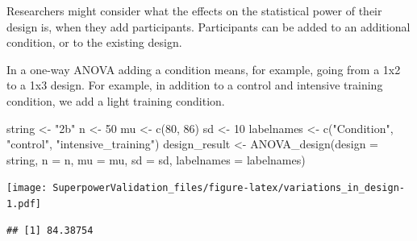 \documentclass[
]{book}
\newenvironment{Shaded}{\begin{snugshade}}{\end{snugshade}}
\newcommand{\AttributeTok}[1]{\textcolor[rgb]{0.77,0.63,0.00}{#1}}
\newcommand{\CommentTok}[1]{\textcolor[rgb]{0.56,0.35,0.01}{\textit{#1}}}
\newcommand{\DecValTok}[1]{\textcolor[rgb]{0.00,0.00,0.81}{#1}}
\newcommand{\FunctionTok}[1]{\textcolor[rgb]{0.00,0.00,0.00}{#1}}
\newcommand{\NormalTok}[1]{#1}
\newcommand{\OtherTok}[1]{\textcolor[rgb]{0.56,0.35,0.01}{#1}}
\newcommand{\SpecialCharTok}[1]{\textcolor[rgb]{0.00,0.00,0.00}{#1}}
\newcommand{\StringTok}[1]{\textcolor[rgb]{0.31,0.60,0.02}{#1}}
\begin{document}
Researchers might consider what the effects on the statistical power of their design is, when they add participants. Participants can be added to an additional condition, or to the existing design.

In a one-way ANOVA adding a condition means, for example, going from a 1x2 to a 1x3 design. For example, in addition to a control and intensive training condition, we add a light training condition.

\begin{Shaded}
\begin{Highlighting}[]
\NormalTok{string }\OtherTok{\textless{}{-}} \StringTok{"2b"}
\NormalTok{n }\OtherTok{\textless{}{-}} \DecValTok{50}
\NormalTok{mu }\OtherTok{\textless{}{-}} \FunctionTok{c}\NormalTok{(}\DecValTok{80}\NormalTok{, }\DecValTok{86}\NormalTok{) }
\NormalTok{sd }\OtherTok{\textless{}{-}} \DecValTok{10}
\NormalTok{labelnames }\OtherTok{\textless{}{-}} \FunctionTok{c}\NormalTok{(}\StringTok{"Condition"}\NormalTok{, }\StringTok{"control"}\NormalTok{, }\StringTok{"intensive\_training"}\NormalTok{) }
\NormalTok{design\_result }\OtherTok{\textless{}{-}} \FunctionTok{ANOVA\_design}\NormalTok{(}\AttributeTok{design =}\NormalTok{ string,}
                   \AttributeTok{n =}\NormalTok{ n, }
                   \AttributeTok{mu =}\NormalTok{ mu, }
                   \AttributeTok{sd =}\NormalTok{ sd, }
                   \AttributeTok{labelnames =}\NormalTok{ labelnames)}
\end{Highlighting}
\end{Shaded}

\texttt{[image: SuperpowerValidation\_files/figure-latex/variations\_in\_design-1.pdf]}

\begin{Shaded}
\end{Shaded}

\begin{verbatim}
## [1] 84.38754
\end{verbatim}

\begin{Shaded}
\end{Shaded}
\end{document}

